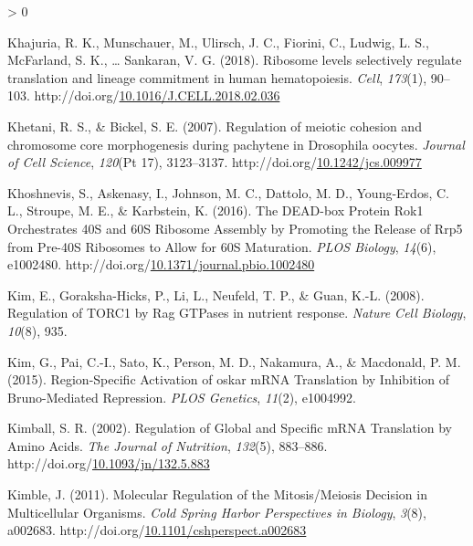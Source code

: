 \documentclass[12pt,oneside]{reedthesis}
\newlength{\cslhangindent}
\newenvironment{CSLReferences}[2] %
 {%
  \setlength{\parindent}{0pt}
  \ifodd #1 \everypar{\setlength{\hangindent}{\cslhangindent}}\ignorespaces\fi
  \ifnum #2 > 0
  \setlength{\parskip}{#2\baselineskip}
  \fi
 }%
 {}
\begin{document}
\begin{CSLReferences}{1}{0}
\leavevmode\hypertarget{ref-Khajuria2018a}{}%
Khajuria, R. K., Munschauer, M., Ulirsch, J. C., Fiorini, C., Ludwig, L. S., McFarland, S. K., \ldots{} Sankaran, V. G. (2018). Ribosome levels selectively regulate translation and lineage commitment in human hematopoiesis. \emph{Cell}, \emph{173}(1), 90--103. http://doi.org/\href{https://doi.org/10.1016/J.CELL.2018.02.036}{10.1016/J.CELL.2018.02.036}

\leavevmode\hypertarget{ref-khetaniRegulationMeioticCohesion2007}{}%
Khetani, R. S., \& Bickel, S. E. (2007). Regulation of meiotic cohesion and chromosome core morphogenesis during pachytene in {Drosophila} oocytes. \emph{Journal of Cell Science}, \emph{120}(Pt 17), 3123--3137. http://doi.org/\href{https://doi.org/10.1242/jcs.009977}{10.1242/jcs.009977}

\leavevmode\hypertarget{ref-khoshnevisDEADboxProteinRok12016}{}%
Khoshnevis, S., Askenasy, I., Johnson, M. C., Dattolo, M. D., Young-Erdos, C. L., Stroupe, M. E., \& Karbstein, K. (2016). The {DEAD-box Protein Rok1 Orchestrates 40S} and {60S Ribosome Assembly} by {Promoting} the {Release} of {Rrp5} from {Pre-40S Ribosomes} to {Allow} for {60S Maturation}. \emph{PLOS Biology}, \emph{14}(6), e1002480. http://doi.org/\href{https://doi.org/10.1371/journal.pbio.1002480}{10.1371/journal.pbio.1002480}

\leavevmode\hypertarget{ref-Kim2008b}{}%
Kim, E., Goraksha-Hicks, P., Li, L., Neufeld, T. P., \& Guan, K.-L. (2008). Regulation of {TORC1} by {Rag GTPases} in nutrient response. \emph{Nature Cell Biology}, \emph{10}(8), 935.

\leavevmode\hypertarget{ref-Kim2015m}{}%
Kim, G., Pai, C.-I., Sato, K., Person, M. D., Nakamura, A., \& Macdonald, P. M. (2015). Region-{Specific Activation} of oskar {mRNA Translation} by {Inhibition} of {Bruno-Mediated Repression}. \emph{PLOS Genetics}, \emph{11}(2), e1004992.

\leavevmode\hypertarget{ref-kimballRegulationGlobalSpecific2002}{}%
Kimball, S. R. (2002). Regulation of {Global} and {Specific mRNA Translation} by {Amino Acids}. \emph{The Journal of Nutrition}, \emph{132}(5), 883--886. http://doi.org/\href{https://doi.org/10.1093/jn/132.5.883}{10.1093/jn/132.5.883}

\leavevmode\hypertarget{ref-kimbleMolecularRegulationMitosis2011}{}%
Kimble, J. (2011). Molecular {Regulation} of the {Mitosis}/{Meiosis Decision} in {Multicellular Organisms}. \emph{Cold Spring Harbor Perspectives in Biology}, \emph{3}(8), a002683. http://doi.org/\href{https://doi.org/10.1101/cshperspect.a002683}{10.1101/cshperspect.a002683}


\end{CSLReferences}
\end{document}
